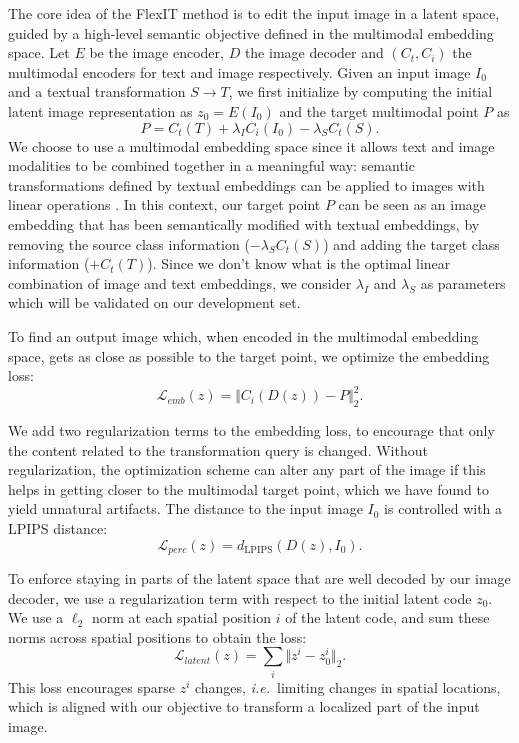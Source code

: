 The core idea of the FlexIT method is to edit the input image in a latent space, 
guided by a high-level semantic objective defined in the multimodal embedding space.
 Let $E$ be the image encoder, $D$ the image decoder and $(C_t, C_i)$ the multimodal 
 encoders for text and image respectively. Given an input image $I_0$ and a textual 
 transformation $S \rightarrow T$, we first initialize \ours by computing the initial 
 latent image representation as $z_0 = E(I_0)$ and the target multimodal point $P$ as
\begin{equation} 
P = C_t(T) + \lambda_{I} C_i(I_0) - \lambda_S C_t(S). \label{eq:p}
\end{equation}
We choose to use a multimodal embedding space since it allows text and image modalities 
to be combined together in a meaningful way: semantic transformations defined by textual
 embeddings can be applied to images with linear operations \citep{jia2021scaling}. In 
 this context, our target point $P$ can be seen as an image embedding that has been
  semantically modified with textual embeddings, by removing the source class information ($-\lambda_S C_t(S)$) 
  and adding the target class information ($+C_t(T)$). Since we don't know what is the optimal linear 
  combination of image and text embeddings, we consider $\lambda_I$ and $\lambda_S$ as parameters
   which will be validated on our development set.

To find an output image which, when encoded in the multimodal embedding space, gets as close as 
possible to the target point, we optimize the embedding loss: 
\begin{equation}
    \mathcal{L}_{emb}(z) = \Vert C_i(D(z)) - P \Vert_2^2.
\end{equation}


We add two regularization terms to the embedding loss, to encourage that only the content related to the transformation query is changed. 
Without regularization, the optimization scheme can alter any part of the image if this helps in getting closer to the multimodal target point, which we have found to yield unnatural artifacts. 
The distance to the input image $I_0$ is controlled with a LPIPS distance:
\begin{equation}
\mathcal{L}_{perc}(z) = d_{\text{LPIPS}} (D(z), I_0). 
\end{equation}

To enforce staying in parts of the latent space that are well decoded by our image decoder, we use a regularization term with respect to the initial latent code $z_0$. 
We use a $\ell_2$ norm at each spatial position $i$ of the latent code, and sum these norms across  spatial positions to obtain the loss: %
\begin{equation}
\mathcal{L}_{latent}(z) = \sum_i \Vert z^i - z_0^i \Vert_2.
\end{equation}
This loss encourages sparse $z^i$ changes, \textit{i.e.}\ limiting changes in spatial locations, which is aligned with our 
objective to transform a localized part of the input image.

